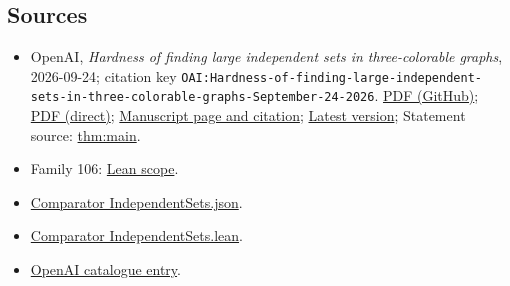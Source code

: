 \documentclass[11pt]{article}
\begin{document}
\subsection{Sources}
\begin{itemize}
\item OpenAI, \emph{Hardness of finding large independent sets in three-colorable graphs}, 2026-09-24; citation key \texttt{OAI:Hardness-of-finding-large-independent-sets-in-three-colorable-graphs-September-24-2026}. \href{https://github.com/openai/math/blob/adc7f1241b42e322a6451854ab7e4b4c146bf78a/preprints/Hardness-of-finding-large-independent-sets-in-three-colorable-graphs-September-24-2026/Hardness-of-finding-large-independent-sets-in-three-colorable-graphs-September-24-2026.pdf}{PDF (GitHub)}; \href{https://github.com/openai/math/raw/adc7f1241b42e322a6451854ab7e4b4c146bf78a/preprints/Hardness-of-finding-large-independent-sets-in-three-colorable-graphs-September-24-2026/Hardness-of-finding-large-independent-sets-in-three-colorable-graphs-September-24-2026.pdf}{PDF (direct)}; \href{https://github.com/openai/math/blob/adc7f1241b42e322a6451854ab7e4b4c146bf78a/preprints/Hardness-of-finding-large-independent-sets-in-three-colorable-graphs-September-24-2026/README.md}{Manuscript page and citation}; \href{https://github.com/openai/math/blob/main/preprints/Hardness-of-finding-large-independent-sets-in-three-colorable-graphs-September-24-2026/Hardness-of-finding-large-independent-sets-in-three-colorable-graphs-September-24-2026.pdf}{Latest version}; Statement source: \href{https://github.com/openai/math/blob/adc7f1241b42e322a6451854ab7e4b4c146bf78a/preprints/Hardness-of-finding-large-independent-sets-in-three-colorable-graphs-September-24-2026/build/source/sections/introduction.tex\#L12}{thm:main}.
\item Family 106: \href{https://github.com/openai/math/blob/adc7f1241b42e322a6451854ab7e4b4c146bf78a/lean/docs/106.md}{Lean scope}.
\item \href{https://github.com/openai/math/blob/adc7f1241b42e322a6451854ab7e4b4c146bf78a/lean/ComparatorChallenges/IndependentSets.json}{Comparator IndependentSets.json}.
\item \href{https://github.com/openai/math/blob/adc7f1241b42e322a6451854ab7e4b4c146bf78a/lean/ComparatorChallenges/IndependentSets.lean}{Comparator IndependentSets.lean}.
\item \href{https://github.com/openai/math/blob/adc7f1241b42e322a6451854ab7e4b4c146bf78a/CONTENTS.md}{OpenAI catalogue entry}.
\end{itemize}
\end{document}
